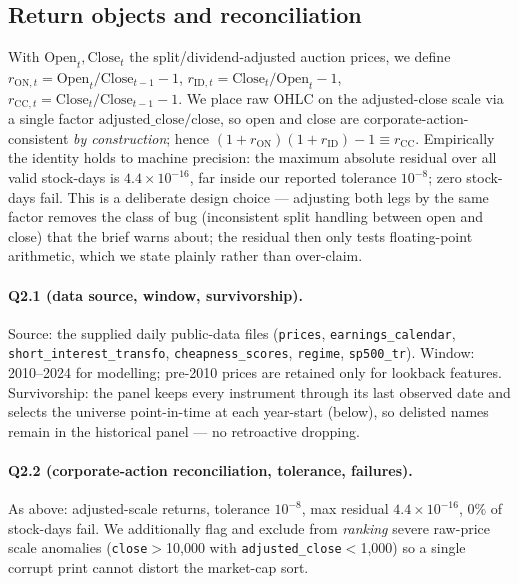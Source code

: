 \documentclass[11pt,a4paper]{article}
\newcommand{\code}[1]{\texttt{#1}}
\newcommand{\reconResid}{4.4\times10^{-16}}
\begin{document}
\subsection{Return objects and reconciliation}
With $\mathrm{Open}_t,\mathrm{Close}_t$ the split/dividend-adjusted auction prices, we define
$r_{\mathrm{ON},t}=\mathrm{Open}_t/\mathrm{Close}_{t-1}-1$,
$r_{\mathrm{ID},t}=\mathrm{Close}_t/\mathrm{Open}_t-1$,
$r_{\mathrm{CC},t}=\mathrm{Close}_t/\mathrm{Close}_{t-1}-1$. We place raw OHLC on the adjusted-close scale via
a single factor $\mathrm{adjusted\_close}/\mathrm{close}$, so open and close are corporate-action-consistent
\emph{by construction}; hence $(1+r_{\mathrm{ON}})(1+r_{\mathrm{ID}})-1\equiv r_{\mathrm{CC}}$. Empirically the
identity holds to machine precision: the maximum absolute residual over all valid stock-days is
$\reconResid$, far inside our reported tolerance $10^{-8}$; zero stock-days fail. This is a deliberate design
choice --- adjusting both legs by the same factor removes the class of bug (inconsistent split handling
between open and close) that the brief warns about; the residual then only tests floating-point arithmetic,
which we state plainly rather than over-claim.

\paragraph{Q2.1 (data source, window, survivorship).} Source: the supplied daily public-data files
(\code{prices}, \code{earnings\_calendar}, \code{short\_interest\_transfo}, \code{cheapness\_scores},
\code{regime}, \code{sp500\_tr}). Window: 2010--2024 for modelling; pre-2010 prices are retained only for
lookback features. Survivorship: the panel keeps every instrument through its last observed date and selects
the universe point-in-time at each year-start (below), so delisted names remain in the historical panel ---
no retroactive dropping.

\paragraph{Q2.2 (corporate-action reconciliation, tolerance, failures).} As above: adjusted-scale returns,
tolerance $10^{-8}$, max residual $\reconResid$, $0\%$ of stock-days fail. We additionally flag and exclude
from \emph{ranking} severe raw-price scale anomalies (\code{close}$>$10{,}000 with \code{adjusted\_close}$<$1{,}000)
so a single corrupt print cannot distort the market-cap sort.
\end{document}
